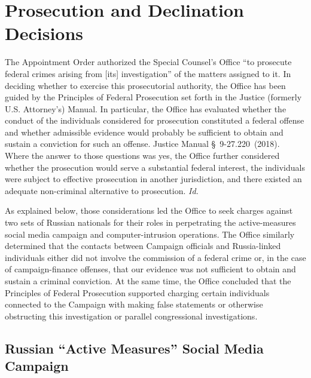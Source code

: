 \section{Prosecution and Declination Decisions}

The Appointment Order authorized the Special Counsel's Office ``to prosecute federal crimes arising from [its] investigation'' of the matters assigned to it.
In deciding whether to exercise this prosecutorial authority, the Office has been guided by the Principles of Federal Prosecution set forth in the Justice (formerly U.S. Attorney's) Manual.
In particular, the Office has evaluated whether the conduct of the individuals considered for prosecution constituted a federal offense and whether admissible evidence would probably be sufficient to obtain and sustain a conviction for such an offense.
Justice Manual \S~9-27.220~(2018).
Where the answer to those questions was yes, the Office further considered whether the prosecution would serve a substantial federal interest, the individuals were subject to effective prosecution in another jurisdiction, and there existed an adequate non-criminal alternative to prosecution.
\textit{Id.}

As explained below, those considerations led the Office to seek charges against two sets of Russian nationals for their roles in perpetrating the active-measures social media campaign and computer-intrusion operations.
The Office similarly determined that the contacts between Campaign officials and Russia-linked individuals either did not involve the commission of a federal crime or, in the case of campaign-finance offenses, that our evidence was not sufficient to obtain and sustain a criminal conviction.
At the same time, the Office concluded that the Principles of Federal Prosecution supported charging certain individuals connected to the Campaign with making false statements or otherwise obstructing this investigation or parallel congressional investigations.

\subsection{Russian ``Active Measures'' Social Media Campaign}

